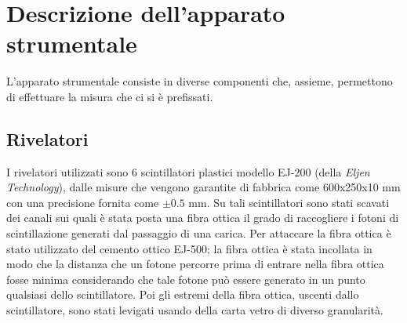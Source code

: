 \section{Descrizione dell'apparato strumentale}
L'apparato strumentale consiste in diverse componenti che, assieme, permettono di effettuare la misura che ci si è prefissati. 
\subsection{Rivelatori}
I rivelatori utilizzati sono 6 scintillatori plastici modello EJ-200 (della \textit{Eljen Technology}), dalle misure che vengono garantite di fabbrica come
600x250x10 mm con una precisione fornita come $\pm 0.5$ mm. Su tali scintillatori sono stati scavati dei canali sui quali è stata  posta una fibra ottica il grado di raccogliere
i fotoni di scintillazione generati dal passaggio di una carica. Per attaccare la fibra ottica è stato utilizzato del cemento ottico EJ-500; la fibra ottica è stata
incollata in modo che la distanza che un fotone percorre prima di entrare nella fibra ottica fosse minima considerando che tale fotone può essere generato in un punto qualsiasi
dello scintillatore. Poi gli estremi della fibra ottica, uscenti dallo scintillatore, sono stati levigati usando della carta vetro di diverso granularit\`a.\\

